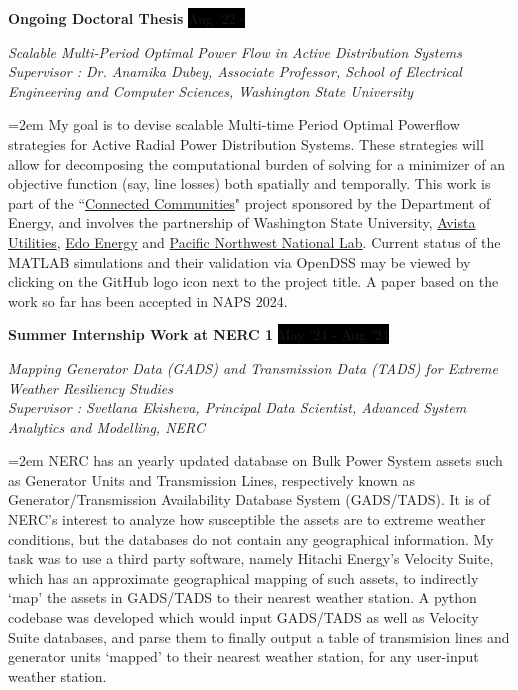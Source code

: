 \documentclass[paper=a4,fontsize=11pt]{scrartcl} %
\newcommand{\sepspace}{\vspace*{1em}}		%
\newcommand{\EducationEntry}[4]{
		\noindent \textbf{#1} \hfill      %
		\colorbox{Black}{%
			\parbox{10em}{%
			\hfill\color{White}#2}} \par  %
		\noindent \textit{#3} \par        %
		\noindent\hangindent=2em\hangafter=0 \small #4 %
		\normalsize \par}
\newcommand{\WorkEntry}[4]{				  %
		\noindent \textbf{#1} \hfill      %
		\colorbox{Black}{\color{White}#2} \par  %
		\noindent \textit{#3} \par              %
		\noindent\hangindent=2em\hangafter=0 \small #4 %
		\normalsize \par}
\begin{document}
\WorkEntry{Ongoing Doctoral Thesis}{Aug '22 - }{Scalable Multi-Period Optimal Power Flow in Active Distribution Systems \href{https://github.com/Realife-Brahmin/MultiPeriod-DistOPF-Benchmark}{\textcolor{matlaborange}{\faGithub}}\\ Supervisor : Dr. Anamika Dubey, Associate Professor, School of Electrical Engineering and Computer Sciences, Washington State University}{My goal is to devise scalable Multi-time Period Optimal Powerflow strategies for Active Radial Power Distribution Systems. These strategies will allow for decomposing the computational burden of solving for a minimizer of an objective function (say, line losses) both spatially and temporally. This work is part of the ``\href{https://www.energy.gov/eere/solar/connected-communities-funding-program}{Connected Communities}" project sponsored by the Department of Energy, and involves the partnership of Washington State University, \href{https://investor.avistacorp.com/}{Avista Utilities}, \href{https://edoenergy.com/about-edo/}{Edo Energy} and \href{https://www.pnnl.gov/about}{Pacific Northwest National Lab}. Current status of the MATLAB simulations and their validation via OpenDSS may be viewed by clicking on the GitHub logo icon next to the project title. A paper based on the work so far has been accepted in NAPS 2024.}

\sepspace 

\WorkEntry{Summer Internship Work at NERC 1}{May '24 - Aug '24}{Mapping Generator Data (GADS) and Transmission Data (TADS) for Extreme Weather Resiliency Studies \href{https://github.com/Realife-Brahmin/Mapping-GADS-and-TADS-repo}{\textcolor{pythonblue}{\faGithub}}\\ Supervisor : Svetlana Ekisheva, Principal Data Scientist, Advanced System Analytics and Modelling, NERC}
{NERC has an yearly updated database on Bulk Power System assets such as Generator Units and Transmission Lines, respectively known as Generator/Transmission Availability Database System (GADS/TADS). It is of NERC's interest to analyze how susceptible the assets are to extreme weather conditions, but the databases do not contain any geographical information. My task was to use a third party software, namely Hitachi Energy's Velocity Suite, which has an approximate geographical mapping of such assets, to indirectly `map' the assets in GADS/TADS to their nearest weather station. A python codebase was developed which would input GADS/TADS as well as Velocity Suite databases, and parse them to finally output a table of transmision lines and generator units `mapped' to their nearest weather station, for any user-input weather station.}
\end{document}
